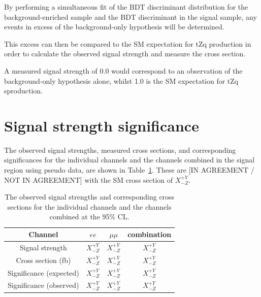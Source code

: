 By performing a simultaneous fit of the BDT discriminant distribution for the background-enriched sample and the BDT discriminant in the signal sample, any events in excess of the background-only hypothesis will be determined.

This excess can then be compared to the SM expectation for tZq production in order to calculate the observed signal strength and measure the cross section.

A measured signal strength of 0.0 would correspond to an observation of the background-only hypothesis alone, whilst 1.0 is the SM expectation for tZq sproduction.

\section{Signal strength significance}
The observed signal strengths, measured cross sections, and corresponding significances for the individual channels and the channels combined in the signal region using pseudo data, are shown in Table~\ref{tab:shapetxs}. 
These are [IN AGREEMENT / NOT IN AGREEMENT] with the SM cross section of  $X^{+Y}_{-Z}$.
 
\begin{table}[!h]
   \centering
   \caption{The observed signal strengths and corresponding cross sections for
   the individual channels and the channels combined at the 95\% CL.}
   \begin{tabular}{cccc}
       \hline
       Channel & $ee$ & $\mu\mu$ & \textbf{combination} \\
        \hline
        Signal strength & $X_{-Z}^{+Y}$ & $X_{-Z}^{+Y}$ & $X_{-Z}^{+Y}$ \\
       Cross section (fb) & $X_{-Z}^{+Y}$ & $X_{-Z}^{+Y}$ & $X_{-Z}^{+Y}$ \\
       Significance (expected) & $X_{-Z}^{+Y}$ & $X_{-Z}^{+Y}$ & $X_{-Z}^{+Y}$ \\
       Significance (observed) & $X_{-Z}^{+Y}$ & $X_{-Z}^{+Y}$ & $X_{-Z}^{+Y}$ \\
        \hline
    \end{tabular}
   \label{tab:shapetxs}
\end{table}


